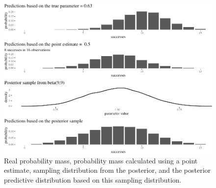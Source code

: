 \documentclass[
  10pt,
  dvipsnames,enabledeprecatedfontcommands]{scrartcl}
\begin{document}
\begin{figure}[H]

\begin{center}\includegraphics[width=0.8\linewidth]{imprecision_philosophical_paper._files/figure-latex/fig:posteriorPrediction2-1} \end{center}


\caption{Real probability mass, probability mass calculated using a point estimate, sampling distribution from the posterior, and the posterior predictive distribution based on this sampling distribution.}
\label{fig:posteriorPrediction}
\end{figure}
\end{document}
